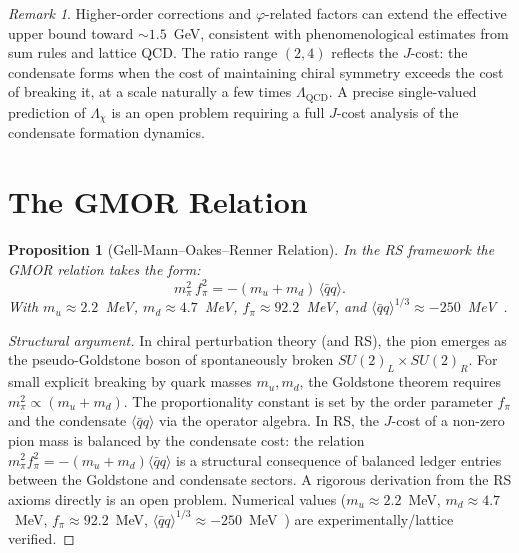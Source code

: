 \documentclass[12pt,a4paper]{article}
\newtheorem{proposition}[theorem]{Proposition}
\theoremstyle{definition}
\theoremstyle{remark}
\newtheorem{remark}[theorem]{Remark}
\begin{document}
\begin{remark}
Higher-order corrections and $\varphi$-related factors can extend
the effective upper bound toward $\sim 1.5$~GeV, consistent with
phenomenological estimates from sum rules and lattice QCD.  The
ratio range $(2,4)$ reflects the $J$-cost: the condensate forms
when the cost of maintaining chiral symmetry exceeds the cost of
breaking it, at a scale naturally a few times $\Lambda_{\mathrm{QCD}}$.
A precise single-valued prediction of $\Lambda_\chi$ is an open
problem requiring a full $J$-cost analysis of the condensate
formation dynamics.
\end{remark}

\section{The GMOR Relation}
\label{sec:gmor}

\begin{proposition}[Gell-Mann--Oakes--Renner Relation]
\label{thm:gmor}
In the RS framework the GMOR relation takes the form:
\begin{equation}
  m_\pi^2\,f_\pi^2 = -(m_u + m_d)\,\langle\bar{q}q\rangle.
\end{equation}
With $m_u \approx 2.2$~MeV, $m_d \approx 4.7$~MeV,
$f_\pi \approx 92.2$~MeV, and
$\langle\bar{q}q\rangle^{1/3} \approx -250$~MeV~\cite{GMOR}.
\end{proposition}

\begin{proof}[Structural argument]
In chiral perturbation theory (and RS), the pion emerges as the
pseudo-Goldstone boson of spontaneously broken $SU(2)_L \times SU(2)_R$.
For small explicit breaking by quark masses $m_u, m_d$, the Goldstone
theorem requires $m_\pi^2 \propto (m_u + m_d)$.  The proportionality
constant is set by the order parameter $f_\pi$ and the condensate
$\langle\bar{q}q\rangle$ via the operator algebra.  In RS, the $J$-cost
of a non-zero pion mass is balanced by the condensate cost:
the relation $m_\pi^2 f_\pi^2 = -(m_u + m_d)\langle\bar{q}q\rangle$
is a structural consequence of balanced ledger entries between the
Goldstone and condensate sectors.  A rigorous derivation from
the RS axioms directly is an open problem.  Numerical values
($m_u\approx2.2$~MeV, $m_d\approx4.7$~MeV, $f_\pi\approx92.2$~MeV,
$\langle\bar{q}q\rangle^{1/3}\approx-250$~MeV~\cite{GMOR}) are
experimentally/lattice verified.
\end{proof}
\end{document}
